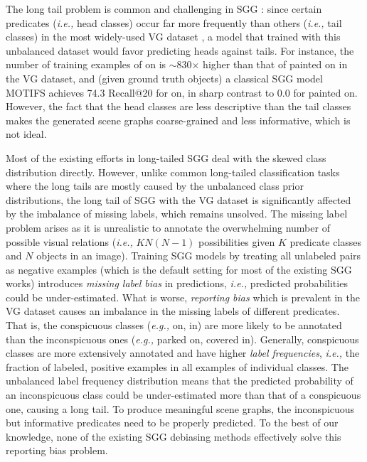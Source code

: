 \documentclass[sigconf]{acmart}
\begin{document}
The long tail problem is common and challenging in SGG \cite{tang2020unbiased}: since certain predicates (\emph{i.e.,} head classes) occur far more frequently than others (\emph{i.e.,} tail classes) in the most widely-used VG dataset \cite{krishna2017visual}, a model that trained with this unbalanced dataset would favor predicting heads against tails.
For instance, the number of training examples of {\selectfont on} is $\sim$830$\times$ higher than that of {\selectfont painted on} in the VG dataset, and (given ground truth objects) a classical SGG model MOTIFS \cite{zellers2018neural} achieves 74.3 Recall@20 for {\selectfont on}, in sharp contrast to 0.0 for {\selectfont painted on}.
However, the fact that the head classes are less descriptive than the tail classes makes the generated scene graphs coarse-grained and less informative, which is not ideal.

Most of the existing efforts in long-tailed SGG \cite{chen2019scene,tang2020unbiased,yan2020pcpl,DBLP:conf/bmvc/WangPL20,10.1145/3394171.3413575,he2020learning} deal with the skewed class distribution directly.
However, unlike common long-tailed classification tasks where the long tails are mostly caused by the unbalanced class prior distributions, the long tail of SGG with the VG dataset is significantly affected by the imbalance of missing labels, which remains unsolved.
The missing label problem arises as it is unrealistic to annotate the overwhelming number of possible visual relations (\emph{i.e.,} $KN(N-1)$ possibilities given $K$ predicate classes and $N$ objects in an image).
Training SGG models by treating all unlabeled pairs as negative examples (which is the default setting for most of the existing SGG works) introduces \textit{missing label bias} in predictions, \emph{i.e.,} predicted probabilities could be under-estimated.
What is worse, \textit{reporting bias} \cite{misra2016seeing,tang2020unbiased} which is prevalent in the VG dataset causes an imbalance in the missing labels of different predicates.
That is, the conspicuous classes (\emph{e.g.,} {\selectfont on}, {\selectfont in}) are more likely to be annotated than the inconspicuous ones (\emph{e.g.,} {\selectfont parked on}, {\selectfont covered in}).
Generally, conspicuous classes are more extensively annotated and have higher \textit{label frequencies}, \emph{i.e.,} the fraction of labeled, positive examples in all examples of individual classes.
The unbalanced label frequency distribution means that the predicted probability of an inconspicuous class could be under-estimated more than that of a conspicuous one, causing a long tail.
To produce meaningful scene graphs, the inconspicuous but informative predicates need to be properly predicted.
To the best of our knowledge, none of the existing SGG debiasing methods \cite{chen2019scene,tang2020unbiased,yan2020pcpl,DBLP:conf/bmvc/WangPL20,10.1145/3394171.3413575,he2020learning} effectively solve this reporting bias problem.
\end{document}
